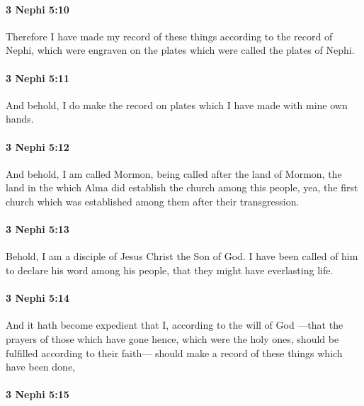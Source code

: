 		\paragraph{3 Nephi 5:10} %
			\label{3NEPHI-5-10}

			Therefore I have made my record of these things
			according to the record of Nephi,
			which were engraven on the plates which were called the plates of Nephi.

		\paragraph{3 Nephi 5:11} %
			\label{3NEPHI-5-11}

			And behold, I do make the record on plates
			which I have made with mine own hands.

		\paragraph{3 Nephi 5:12} %
			\label{3NEPHI-5-12}

			And behold, I am called Mormon,
			being called after the land of Mormon,
			the land in the which Alma did establish the church among this people,
			yea, the first church which was established among them after their transgression.

		\paragraph{3 Nephi 5:13} %
			\label{3NEPHI-5-13}

			Behold, I am a disciple of Jesus Christ the Son of God.
			I have been called of him to declare his word among his people,
			that they might have everlasting life.

		\paragraph{3 Nephi 5:14} %
			\label{3NEPHI-5-14}

			And it hath become expedient
			that I, according to the will of God
			---that the prayers of those which have gone hence,
			which were the holy ones,
			should be fulfilled according to their faith---
			should make a record of these things which have been done,

		\paragraph{3 Nephi 5:15} %
			\label{3NEPHI-5-15}

